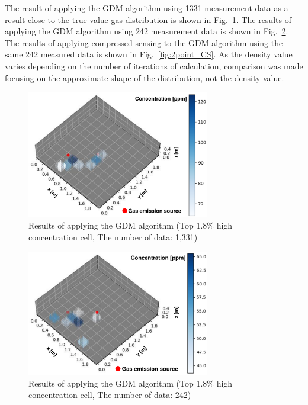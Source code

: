 \documentclass[fleqn,10pt,twocolumn]{SICE19}
\newcommand{\Figref}[1]{Fig.~\ref{#1}}
\begin{document}
 The result of applying the GDM algorithm using 1331 measurement data as a result close to the true value gas distribution is shown in \Figref{fig:11point_NP}. The results of applying the GDM algorithm using 242 measurement data is shown in \Figref{fig:2point_NP}. The results of applying compressed sensing to the GDM algorithm using the same 242 measured data is shown in \Figref{fig:2point_CS}. As the density value varies depending on the number of iterations of calculation, comparison was made focusing on the approximate shape of the distribution, not the density value.

\begin{figure}[h]
\begin{center}
\includegraphics[width=80mm]{11point_NP.pdf}
\caption{\label{fig:11point_NP} Results of applying the GDM algorithm (Top 1.8\% high concentration cell, The number of data: 1,331)}
\end{center}
\end{figure}

\begin{figure}[h]
\begin{center}
\includegraphics[width=80mm]{2point_NP.pdf}
\caption{\label{fig:2point_NP} Results of applying the GDM algorithm (Top 1.8\% high concentration cell, The number of data: 242)}
\end{center}
\end{figure}
\end{document}
